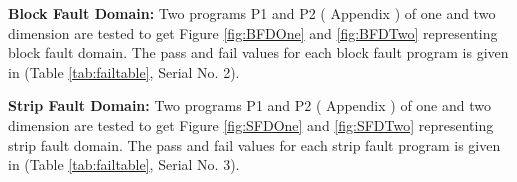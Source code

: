 \documentclass{acm_proc_article-sp}
\begin{document}


\textbf{Block Fault Domain:} Two programs P1 and P2 ( Appendix ) of one and two dimension are tested to get Figure \ref{fig:BFDOne} and \ref{fig:BFDTwo} representing block fault domain. The pass and fail values for each block fault program is given in (Table \ref{tab:failtable}, Serial No. 2).






\textbf{Strip Fault Domain:} Two programs P1 and P2 ( Appendix ) of one and two dimension are tested to get Figure \ref{fig:SFDOne} and \ref{fig:SFDTwo} representing strip fault domain. The pass and fail values for each strip fault program is given in (Table \ref{tab:failtable}, Serial No. 3).




\end{document}

